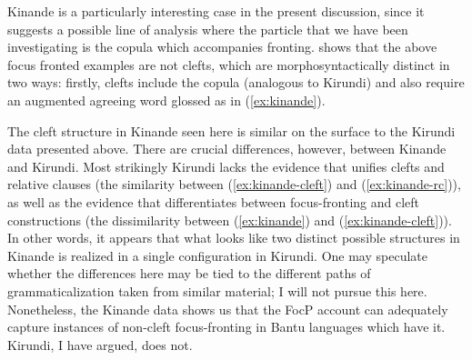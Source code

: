 \documentclass[12pt]{article}
\begin{document}
\bex
\ex {} \label{ex:kinande}
\bxl
{}
\fxl
\fex

Kinande is a particularly interesting case in the present discussion, since it suggests a possible line of analysis where the particle  that we have been investigating is the copula which accompanies fronting. \citeauthor{schneider-zioga-2007} shows that the above focus fronted examples are not clefts, which are morphosyntactically distinct in two ways: firstly, clefts include the copula  (analogous to Kirundi) and also require an augmented agreeing word glossed as  in (\ref{ex:kinande}). 

\bex
\ex {}
\bxl
{} \label{ex:kinande-cleft}
 \label{ex:kinande-rc}
\fxl
\fex

The cleft structure in Kinande seen here is similar on the surface to the Kirundi data presented above. There are crucial differences, however, between Kinande and Kirundi. Most strikingly Kirundi lacks the evidence that unifies clefts and relative clauses (the similarity between (\ref{ex:kinande-cleft}) and (\ref{ex:kinande-rc})), as well as the evidence that differentiates between focus-fronting and cleft constructions (the dissimilarity between (\ref{ex:kinande}) and (\ref{ex:kinande-cleft})). In other words, it appears that what looks like two distinct possible structures in Kinande is realized in a single configuration in Kirundi. One may speculate whether the differences here may be tied to the different paths of grammaticalization taken from similar material; I will not pursue this here. Nonetheless, the Kinande data shows us that the FocP account can adequately capture instances of non-cleft focus-fronting in Bantu languages which have it. Kirundi, I have argued, does not. 
\end{document}
